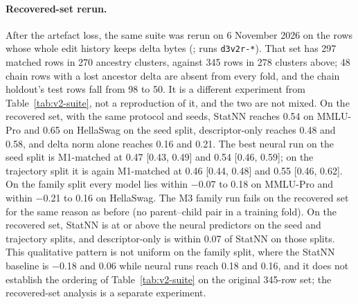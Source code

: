 \paragraph{Recovered-set rerun.} After the artefact loss, the same suite was rerun on 6 November 2026 on the rows whose whole edit history keeps delta bytes (; runs \texttt{d3v2r-*}). That set has 297 matched rows in 270 ancestry clusters, against 345 rows in 278 clusters above; 48 chain rows with a lost ancestor delta are absent from every fold, and the chain holdout's test rows fall from 98 to 50. It is a different experiment from Table~\ref{tab:v2-suite}, not a reproduction of it, and the two are not mixed. On the recovered set, with the same protocol and seeds, StatNN reaches 0.54 on MMLU-Pro and 0.65 on HellaSwag on the seed split, descriptor-only reaches 0.48 and 0.58, and delta norm alone reaches 0.16 and 0.21. The best neural run on the seed split is M1-matched at 0.47 [0.43, 0.49] and 0.54 [0.46, 0.59]; on the trajectory split it is again M1-matched at 0.46 [0.44, 0.48] and 0.55 [0.46, 0.62]. On the family split every model lies within $-$0.07 to 0.18 on MMLU-Pro and within $-$0.21 to 0.16 on HellaSwag. The M3 family run fails on the recovered set for the same reason as before (no parent--child pair in a training fold). On the recovered set, StatNN is at or above the neural predictors on the seed and trajectory splits, and descriptor-only is within 0.07 of StatNN on those splits. This qualitative pattern is not uniform on the family split, where the StatNN baseline is $-$0.18 and 0.06 while neural runs reach 0.18 and 0.16, and it does not establish the ordering of Table~\ref{tab:v2-suite} on the original 345-row set; the recovered-set analysis is a separate experiment.

